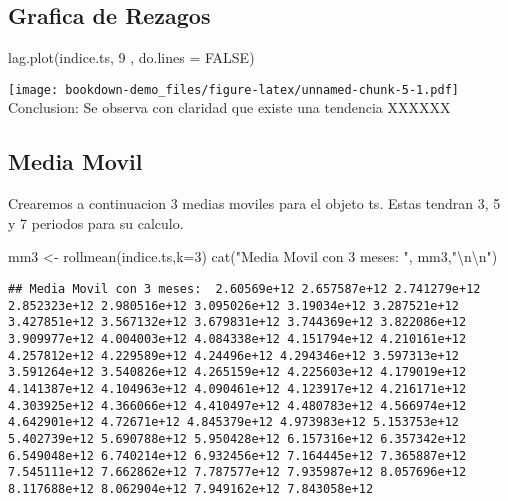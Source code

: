 \documentclass[
]{book}
\newenvironment{Shaded}{\begin{snugshade}}{\end{snugshade}}
\newcommand{\AttributeTok}[1]{\textcolor[rgb]{0.77,0.63,0.00}{#1}}
\newcommand{\ConstantTok}[1]{\textcolor[rgb]{0.00,0.00,0.00}{#1}}
\newcommand{\DecValTok}[1]{\textcolor[rgb]{0.00,0.00,0.81}{#1}}
\newcommand{\FunctionTok}[1]{\textcolor[rgb]{0.00,0.00,0.00}{#1}}
\newcommand{\NormalTok}[1]{#1}
\newcommand{\OtherTok}[1]{\textcolor[rgb]{0.56,0.35,0.01}{#1}}
\newcommand{\SpecialCharTok}[1]{\textcolor[rgb]{0.00,0.00,0.00}{#1}}
\newcommand{\StringTok}[1]{\textcolor[rgb]{0.31,0.60,0.02}{#1}}
\begin{document}
\hypertarget{grafica-de-rezagos}{%
\subsection{Grafica de Rezagos}\label{grafica-de-rezagos}}

\begin{Shaded}
\begin{Highlighting}[]
\FunctionTok{lag.plot}\NormalTok{(indice.ts, }\DecValTok{9}\NormalTok{ , }\AttributeTok{do.lines =} \ConstantTok{FALSE}\NormalTok{)}
\end{Highlighting}
\end{Shaded}

\texttt{[image: bookdown-demo\_files/figure-latex/unnamed-chunk-5-1.pdf]}
Conclusion: Se observa con claridad que existe una tendencia XXXXXX

\hypertarget{media-movil}{%
\subsection{Media Movil}\label{media-movil}}

Crearemos a continuacion 3 medias moviles para el objeto ts. Estas tendran 3, 5 y 7 periodos para su calculo.

\begin{Shaded}
\begin{Highlighting}[]
\NormalTok{mm3 }\OtherTok{\textless{}{-}} \FunctionTok{rollmean}\NormalTok{(indice.ts,}\AttributeTok{k=}\DecValTok{3}\NormalTok{)}
\FunctionTok{cat}\NormalTok{(}\StringTok{"Media Movil con 3 meses: "}\NormalTok{, mm3,}\StringTok{"}\SpecialCharTok{\textbackslash{}n\textbackslash{}n}\StringTok{"}\NormalTok{)}
\end{Highlighting}
\end{Shaded}

\begin{verbatim}
## Media Movil con 3 meses:  2.60569e+12 2.657587e+12 2.741279e+12 2.852323e+12 2.980516e+12 3.095026e+12 3.19034e+12 3.287521e+12 3.427851e+12 3.567132e+12 3.679831e+12 3.744369e+12 3.822086e+12 3.909977e+12 4.004003e+12 4.084338e+12 4.151794e+12 4.210161e+12 4.257812e+12 4.229589e+12 4.24496e+12 4.294346e+12 3.597313e+12 3.591264e+12 3.540826e+12 4.265159e+12 4.225603e+12 4.179019e+12 4.141387e+12 4.104963e+12 4.090461e+12 4.123917e+12 4.216171e+12 4.303925e+12 4.366066e+12 4.410497e+12 4.480783e+12 4.566974e+12 4.642901e+12 4.72671e+12 4.845379e+12 4.973983e+12 5.153753e+12 5.402739e+12 5.690788e+12 5.950428e+12 6.157316e+12 6.357342e+12 6.549048e+12 6.740214e+12 6.932456e+12 7.164445e+12 7.365887e+12 7.545111e+12 7.662862e+12 7.787577e+12 7.935987e+12 8.057696e+12 8.117688e+12 8.062904e+12 7.949162e+12 7.843058e+12
\end{verbatim}
\end{document}
